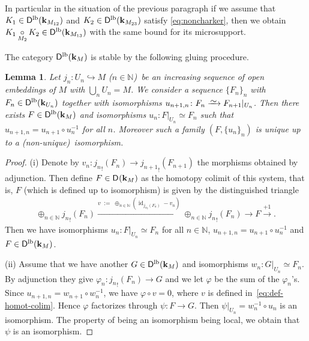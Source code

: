\documentclass[12pt,leqno]{article}
\newtheorem{lemma}[theorem]{Lemma}
\theoremstyle{definition}
\newcommand{\N}{{\mathbb{N}}}
\def\phi{{\varphi}}
\newcommand{\cor}{{\bf k}}
\renewcommand{\to}[1][]{\xrightarrow[]{#1}}
\newcommand{\isoto}[1][]{\xrightarrow[#1]%
{{\raisebox{-.6ex}[0ex][-.6ex]{$\mspace{1mu}\sim\mspace{2mu}$}}}}
\newcommand{\conv}[1][]{\mathop{\circ}\limits_{#1}}
\newcommand{\eim}[1]{{#1}_!}
\newcommand{\opb}[1]{#1^{-1}}
\newcommand{\eqdot}{\mathbin{:=}}
\newcommand{\cl}{\colon}
\newcommand{\lp}{{\rm(}}
\newcommand{\rp}{{\rm)}}
\newcommand{\eq}{\begin{eqnarray}}
\newcommand{\eneq}{\end{eqnarray}}
\DeclareMathOperator{\id}{id}
\newcommand{\Der}[1][]{\mathsf{D}^{#1}}
\newcommand{\Derlb}{\Der[\mathrm{lb}]}
\numberwithin{equation}{section}
\begin{document}
In particular in the situation of the previous paragraph if we assume
that 
$K_1 \in \Derlb(\cor_{M_{12}})$ and $K_2 \in\Derlb(\cor_{M_{23}})$
satisfy \eqref{eq:noncharker}, then we
obtain $K_1\conv[M_2] K_2 \in \Derlb(\cor_{M_{13}})$ with the same bound for
its microsupport.

The category $\Derlb(\cor_M)$ is stable by the following gluing procedure.

\begin{lemma}\label{le:stack2}
Let $j_n\cl U_n \hookrightarrow M$ \lp$n\in \N$\rp\, be an increasing sequence of
open embeddings of $M$ with $\bigcup_n U_n=M$.
We consider a sequence $\{F_n\}_n$ with $F_n\in\Derlb(\cor_{U_n})$ together with isomorphisms
$u_{n+1,n}\cl F_n \isoto F_{n+1}\vert_{U_n}$.  Then there exists 
$F\in \Derlb(\cor_M)$ and isomorphisms $u_n\cl F\vert_{U_n} \simeq F_n$ 
such that $u_{n+1,n}=u_{n+1}\circ \opb{u_n}$ for all $n$.
Moreover such a family $(F,\{u_n\}_n)$ is unique up to 
a \lp non-unique\rp\ isomorphism.
\end{lemma}
\begin{proof}
(i) Denote by
$v_n\cl \eim{j_n}(F_n)\to\eim{j_{n+1}}(F_{n+1})$  the morphisms
obtained by  adjunction.
Then define $F\in\Der(\cor_M)$  as the homotopy
colimit of this system, that is, 
$F$ (which is defined up to isomorphism) is given by the distinguished triangle
\eq\label{eq:def-homot-colim}
\oplus_{n\in \N} \eim{j_n}(F_n)
\to[{v \; \eqdot \; \oplus_{n\in \N} (\id_{\eim{j_n}(F_n)} - v_n)}]
\oplus_{n\in \N} \eim{j_n}(F_n)\to F \to[+1].
\eneq
Then we have isomorphisms $u_n\cl F\vert_{U_n} \simeq F_n$ for all
$n\in\N$, $u_{n+1,n}=u_{n+1}\circ \opb{u_n}$ and $F\in \Derlb(\cor_M)$.

\medskip\noindent
(ii) Assume that we have another $G\in \Derlb(\cor_M)$ and isomorphisms
$w_n\cl G|_{U_n} \simeq F_n$.  By adjunction they give
$\phi_n\cl \eim{j_n}(F_n)\to G$ and we let $\phi$ be the sum of the
$\phi_n$'s. Since $u_{n+1,n}=w_{n+1}\circ \opb{w_n}$, we have $\phi\circ v =0$,
where $v$ is defined in~\eqref{eq:def-homot-colim}.
Hence $\phi$ factorizes through $\psi\cl F \to G$.
Then $\psi|_{U_n} = \opb{w_n}\circ u_n$ is an isomorphism.
The property of being an isomorphism being local, we obtain that $\psi$ is
an isomorphism.
\end{proof}
\end{document}
